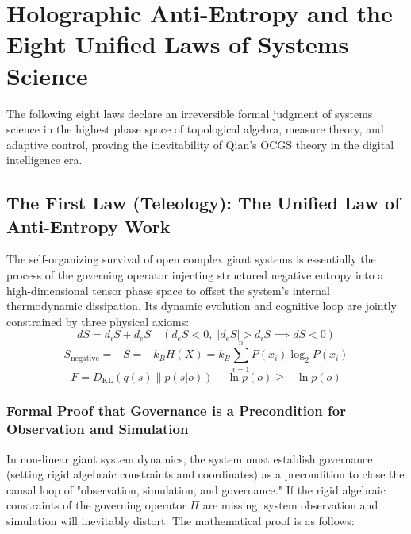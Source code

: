 \documentclass[11pt,a4paper]{article}
\begin{document}
\section{Holographic Anti-Entropy and the Eight Unified Laws of Systems Science}

The following eight laws declare an irreversible formal judgment of systems science in the highest phase space of topological algebra, measure theory, and adaptive control, proving the inevitability of Qian's OCGS theory in the digital intelligence era.

\subsection*{The First Law (Teleology): The Unified Law of Anti-Entropy Work}
The self-organizing survival of open complex giant systems is essentially the process of the governing operator injecting structured negative entropy into a high-dimensional tensor phase space to offset the system's internal thermodynamic dissipation. Its dynamic evolution and cognitive loop are jointly constrained by three physical axioms:
\begin{equation}
    dS = d_iS + d_eS \quad \left( d_eS < 0, \; |d_eS| > d_iS \implies dS < 0 \right)
\end{equation}
\begin{equation}
    S_{\text{negative}} = -S = -k_B H(X) = k_B \sum_{i=1}^{n} P(x_i) \log_2 P(x_i)
\end{equation}
\begin{equation}
    F = D_{\text{KL}}\left(q(s) \parallel p(s|o)\right) - \ln p(o) \ge -\ln p(o)
\end{equation}

\subsubsection*{Formal Proof that Governance is a Precondition for Observation and Simulation}
In non-linear giant system dynamics, the system must establish governance (setting rigid algebraic constraints and coordinates) as a precondition to close the causal loop of "observation, simulation, and governance." If the rigid algebraic constraints of the governing operator $\Pi$ are missing, system observation and simulation will inevitably distort. The mathematical proof is as follows:
\end{document}
